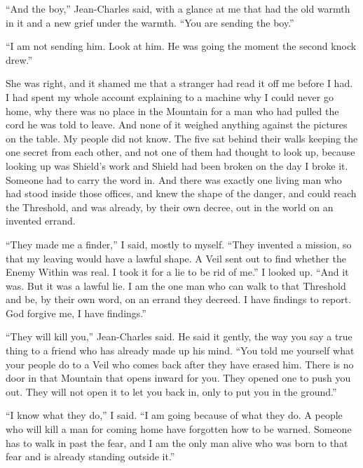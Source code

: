 ``And the boy,'' Jean-Charles said, with a glance at me that had the old warmth in it and a new grief under the warmth. ``You are sending the boy.''\par

``I am not sending him. Look at him. He was going the moment the second knock drew.''\par

She was right, and it shamed me that a stranger had read it off me before I had. I had spent my whole account explaining to a machine why I could never go home, why there was no place in the Mountain for a man who had pulled the cord he was told to leave. And none of it weighed anything against the pictures on the table. My people did not know. The five sat behind their walls keeping the one secret from each other, and not one of them had thought to look up, because looking up was Shield's work and Shield had been broken on the day I broke it. Someone had to carry the word in. And there was exactly one living man who had stood inside those offices, and knew the shape of the danger, and could reach the Threshold, and was already, by their own decree, out in the world on an invented errand.\par

``They made me a finder,'' I said, mostly to myself. ``They invented a mission, so that my leaving would have a lawful shape. A Veil sent out to find whether the Enemy Within was real. I took it for a lie to be rid of me.'' I looked up. ``And it was. But it was a lawful lie. I am the one man who can walk to that Threshold and be, by their own word, on an errand they decreed. I have findings to report. God forgive me, I have findings.''\par

``They will kill you,'' Jean-Charles said. He said it gently, the way you say a true thing to a friend who has already made up his mind. ``You told me yourself what your people do to a Veil who comes back after they have erased him. There is no door in that Mountain that opens inward for you. They opened one to push you out. They will not open it to let you back in, only to put you in the ground.''\par

``I know what they do,'' I said. ``I am going because of what they do. A people who will kill a man for coming home have forgotten how to be warned. Someone has to walk in past the fear, and I am the only man alive who was born to that fear and is already standing outside it.''\par

